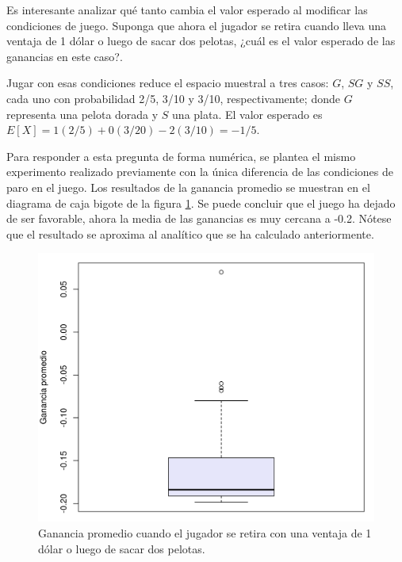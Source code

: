 \documentclass[12pt]{article}
\begin{document}
	Es interesante analizar qué tanto cambia el valor esperado al modificar las condiciones de juego. Suponga que ahora el jugador se retira cuando lleva una ventaja de 1 dólar o luego de sacar dos pelotas, ¿cuál es el valor esperado de las ganancias en este caso?. 
	
	Jugar con esas condiciones reduce el espacio muestral a tres casos: $G$, $SG$ y $SS$, cada uno con probabilidad 2/5, 3/10 y 3/10, respectivamente; donde $G$ representa una pelota dorada y $S$ una plata. El valor esperado es $E[X] = 1(2/5) + 0(3/20) - 2(3/10) = -1/5$.
	
	Para responder a esta pregunta de forma numérica, se plantea el mismo experimento realizado previamente con la única diferencia de las condiciones de paro en el juego. Los resultados de la ganancia promedio se muestran en el diagrama de caja bigote de la figura \ref{pelotas_gana1_osale2}. Se puede concluir que el juego ha dejado de ser favorable, ahora la media de las ganancias es muy cercana a -0.2. Nótese que el resultado se aproxima al analítico que se ha calculado anteriormente.%
	
	\begin{figure}
		\centering
		\includegraphics[scale=0.5]{pelotas_gana1_osale2.png}
		\caption{Ganancia promedio cuando el jugador se retira con una ventaja de 1 dólar o luego de sacar dos pelotas.}
		\label{pelotas_gana1_osale2}
	\end{figure}
	
\end{document}
